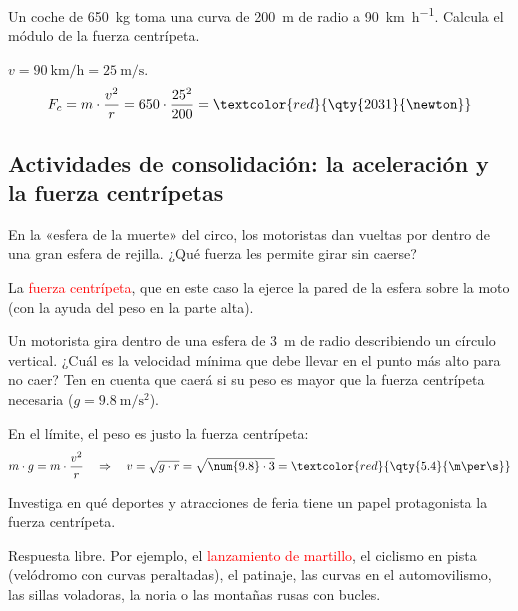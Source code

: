 \begin{exercise}
    Un coche de \qty{650}{\kg} toma una curva de \qty{200}{\m} de radio a \qty{90}{\km\per\hour}. Calcula el módulo de la fuerza centrípeta.
    \begin{solu}
        \(v = \qty{90}{\km\per\hour} = \qty{25}{\m\per\s}\).
        \[ F_c = m \cdot \frac{v^2}{r} = 650 \cdot \frac{25^2}{200} = \textcolor{red}{\qty{2031}{\newton}} \]
    \end{solu}
\end{exercise}

\subsection*{Actividades de consolidación: la aceleración y la fuerza centrípetas}

\begin{exercise}
    En la «esfera de la muerte» del circo, los motoristas dan vueltas por dentro de una gran esfera de rejilla. ¿Qué fuerza les permite girar sin caerse?
    \begin{solu}
        La \textcolor{red}{fuerza centrípeta}, que en este caso la ejerce la pared de la esfera sobre la moto (con la ayuda del peso en la parte alta).
    \end{solu}
\end{exercise}

\begin{exercise}
    Un motorista gira dentro de una esfera de \qty{3}{\m} de radio describiendo un círculo vertical. ¿Cuál es la velocidad mínima que debe llevar en el punto más alto para no caer? Ten en cuenta que caerá si su peso es mayor que la fuerza centrípeta necesaria (\(g = \qty{9.8}{\m\per\square\s}\)).
    \begin{solu}
        En el límite, el peso es justo la fuerza centrípeta:
        \[ m \cdot g = m \cdot \frac{v^2}{r} \quad\Rightarrow\quad v = \sqrt{g \cdot r} = \sqrt{\num{9.8} \cdot 3} = \textcolor{red}{\qty{5.4}{\m\per\s}} \]
    \end{solu}
\end{exercise}

\begin{exercise}
    Investiga en qué deportes y atracciones de feria tiene un papel protagonista la fuerza centrípeta.
    \begin{solu}
        Respuesta libre. Por ejemplo, el \textcolor{red}{lanzamiento de martillo}, el ciclismo en pista (velódromo con curvas peraltadas), el patinaje, las curvas en el automovilismo, las sillas voladoras, la noria o las montañas rusas con bucles.
    \end{solu}
\end{exercise}

